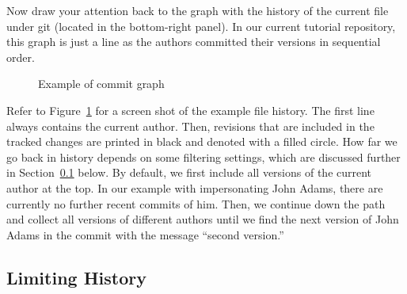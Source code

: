 Now draw your attention back to the graph with the history of the current file under git (located in the bottom-right panel).  In our current tutorial repository, this graph is just a line as the authors committed their versions in sequential order.  %
\begin{figure}[t]
\centering
{}
\caption{Example of commit graph} \label{fig:commit-graph}
\end{figure}
Refer to Figure~\ref{fig:commit-graph} for a screen shot of the example file history. The first line always contains the current author.  Then, revisions that are included in the tracked changes are printed in black and denoted with a filled circle.  How far we go back in history depends on some filtering settings, which are discussed further in Section~\ref{sec:limit-history} below.  By default, we first include all versions of the current author at the top.  In our example with impersonating John Adams, there are currently no further recent commits of him.  Then, we continue down the path and collect all versions of different authors until we find the next version of John Adams in the commit with the message ``second version.''


\subsection{Limiting History} \label{sec:limit-history}

